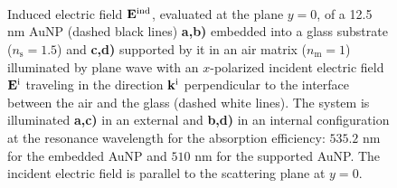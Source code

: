 \begin{figure}[t!]\centering
   \def\svgwidth{.75 \textwidth}
   \footnotesize
   \\[-32.6em]
   \hspace*{-.25\textwidth}
       \begin{subfigure}{.25\textwidth}\textcolor{red}{\caption{ } \label{sfig:Near:EE}}\end{subfigure}%
       \begin{subfigure}{.36\textwidth}\caption{ }\label{sfig:Near:EI}\end{subfigure}\\[13em]
   \hspace*{-.25\textwidth}
       \begin{subfigure}{.25\textwidth}\caption{ } \label{sfig:Near:SE}\end{subfigure}%
       \begin{subfigure}{.36\textwidth}\caption{ }\label{sfig:Near:SI}\end{subfigure}\\[15em]
   \caption[Induced Electric Field of a 12.5 nm Au Spherical NP embbeded into (supported by) a substrate illuminated at a normal incidence]{Induced electric field $\vb{E}^\text{ind}$, evaluated at the plane $y = 0$, of a 12.5 nm AuNP (dashed black lines) \textbf{a,b)} embedded into a glass substrate ($n_\text{s} = 1.5$) and \textbf{c,d)} supported by it in an air matrix ($n_\text{m} = 1$) illuminated by plane wave with an $x$-polarized incident electric field $\vb{E}^\text{i}$ traveling in the direction $\vb{k}^\text{i}$ perpendicular to the interface between the air and the glass (dashed white lines). The system is illuminated \textbf{a,c)}  in an external and \textbf{b,d)} in an internal configuration at the resonance  wavelength for the absorption efficiency: $535.2$ nm for the embedded AuNP and $510$ nm for the supported AuNP. The incident electric field is parallel to the scattering plane at $y=0$.
   }
   \label{fig:Near:IntExt}
 \end{figure}

